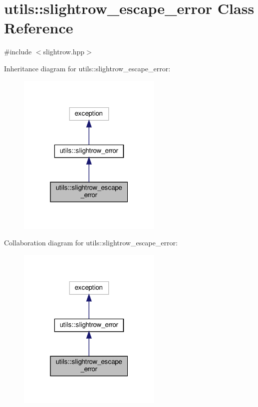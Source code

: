 \hypertarget{classutils_1_1slightrow__escape__error}{}\section{utils\+:\+:slightrow\+\_\+escape\+\_\+error Class Reference}
\label{classutils_1_1slightrow__escape__error}


{\ttfamily \#include $<$slightrow.\+hpp$>$}



Inheritance diagram for utils\+:\+:slightrow\+\_\+escape\+\_\+error\+:\nopagebreak
\begin{figure}[H]
\begin{center}
\leavevmode
\includegraphics[width=196pt]{classutils_1_1slightrow__escape__error__inherit__graph}
\end{center}
\end{figure}


Collaboration diagram for utils\+:\+:slightrow\+\_\+escape\+\_\+error\+:\nopagebreak
\begin{figure}[H]
\begin{center}
\leavevmode
\includegraphics[width=196pt]{classutils_1_1slightrow__escape__error__coll__graph}
\end{center}
\end{figure}


